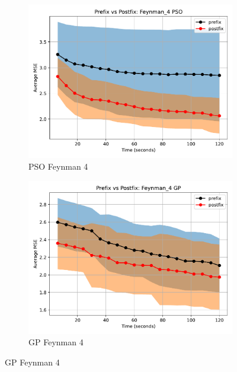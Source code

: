 \documentclass[12pt]{iopart}
\begin{document}
\begin{figure}
    \vspace{0.5cm}
    
    \begin{subfigure}[b]{0.4\textwidth}
        \includegraphics[width=\linewidth, keepaspectratio]{AIFeynman_Benchmarks/PrePostFeynman_4PSO.pdf}
        \caption{PSO Feynman 4}
        \label{subfig:feynman_4_PSO}
    \end{subfigure}
    \begin{subfigure}[b]{0.4\textwidth}
        \includegraphics[width=\linewidth, keepaspectratio]{AIFeynman_Benchmarks/PrePostFeynman_4GP.pdf}
        \caption{GP Feynman 4}
        \label{subfig:feynman_4_GP}
    \end{subfigure}
    

\end{figure}
\end{document}
